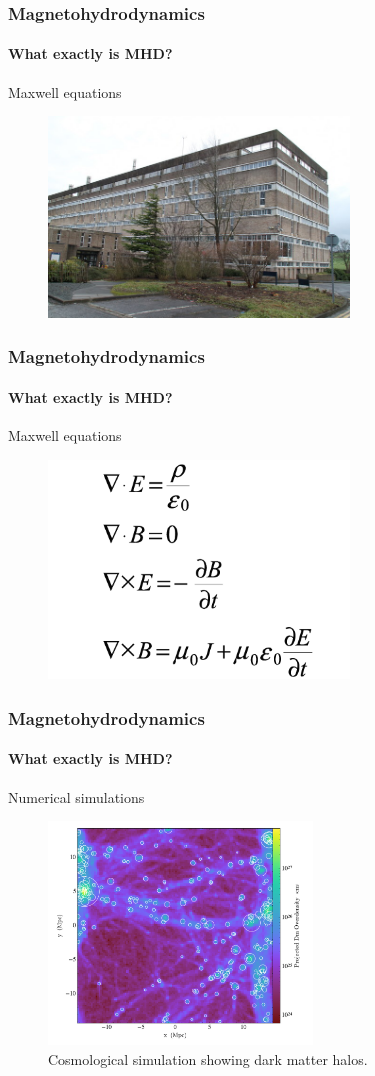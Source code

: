 \documentclass{beamer}
\begin{document}
\begin{frame}
 \frametitle{Magnetohydrodynamics}
 \framesubtitle{What exactly is MHD?}
 
 Maxwell equations
 \begin{figure}
  \includegraphics[width=8cm]{img/jcmb}
 \end{figure}

\end{frame}

\begin{frame}
 \frametitle{Magnetohydrodynamics}
 \framesubtitle{What exactly is MHD?}
 
 Maxwell equations
 \begin{figure}
  \includegraphics[width=8cm]{img/maxwells_eqns}
 \end{figure}

\end{frame}

\begin{frame}
 \frametitle{Magnetohydrodynamics}
 \framesubtitle{What exactly is MHD?}
 
 Numerical simulations
 \begin{figure}
  \includegraphics[width=7cm]{img/halos}
  \centering
  \caption{Cosmological simulation showing dark matter halos.}
 \end{figure}

\end{frame}
\end{document}
